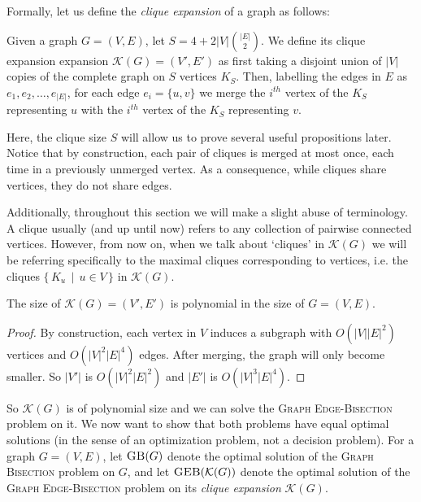 \documentclass{article}
\newcommand{\gb}{\textsc{Graph \allowbreak Bisection} }
\newcommand{\geb}{\textsc{Graph \allowbreak Edge-\allowbreak Bisection} }
\newcommand{\sgeb}{\textsc{GEB} }
\newcommand{\sgb}{\textsc{GB} }
\begin{document}
	Formally, let us define the \textit{clique expansion} of a graph as
	follows:

	\begin{definition}
		\label{clique-expansion}
		Given a graph $G = (V, E)$,
		let $S = 4 + 2|V|\binom{|E|}{2}$.
		We define its clique expansion expansion
		$\mathcal{K}(G) = (V', E')$ as first taking a disjoint union of $|V|$
		copies of the complete graph on $S$ vertices $K_S$. Then, labelling the
		edges in $E$ as $e_1, e_2, \dots, e_{|E|}$, for each edge
		$e_i = \{u, v\}$
		we merge the $i^{th}$ vertex of the $K_S$ representing $u$ with the
		$i^{th}$ vertex of the $K_S$ representing $v$.
	\end{definition}

	Here, the clique size $S$ will allow us to prove several
	useful propositions later. Notice that by construction, each pair of
	cliques is merged at most once, each time in a previously unmerged vertex.
	As a consequence, while cliques share vertices, they do not share edges.

	Additionally, throughout this section we will make a slight abuse of
	terminology. A clique usually (and up until now) refers to any collection
	of pairwise connected vertices. However, from now on, when we talk about
	`cliques' in $\mathcal{K}(G)$ we will be referring specifically to the
	maximal cliques corresponding to vertices, i.e. the cliques
	$\{\, K_u \,\mid\, u \in V \,\}$ in $\mathcal{K}(G)$.

	\begin{proposition}
		\label{poly-size}
		The size of $\mathcal{K}(G) = (V', E')$ is polynomial in the size of
		$G = (V, E)$.
	\end{proposition}
	\begin{proof}
		By construction, each vertex in $V$ induces a subgraph with
		$O(|V||E|^2)$
		vertices and $O(|V|^2|E|^4)$ edges. After merging, the graph will only
		become smaller. So $|V'|$ is $O(|V|^2 |E|^2)$ and $|E'|$ is
		$O(|V|^3|E|^4)$.
	\end{proof}

	So $\mathcal{K}(G)$ is of polynomial size and we can solve the \geb problem
	on it. We now want to show that both problems have equal optimal solutions
	(in the sense of an optimization problem, not a decision problem). For
	a graph $G=(V, E)$, let $\sgb(G)$ denote the optimal solution of the \gb
	problem on $G$, and let $\sgeb(\mathcal{K}(G))$ denote the optimal solution
	of the \geb problem on its \textit{clique expansion} $\mathcal{K}(G)$.
\end{document}
